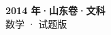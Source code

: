 \documentclass[zihao=-4, a4paper]{ctexart}
\begin{document}
\begin{center}
  {\Large\bfseries 2014 年·山东卷·文科}\\[4pt]
  {\large 数学 · 试题版}
\end{center}
\medskip
{}

\end{document}
